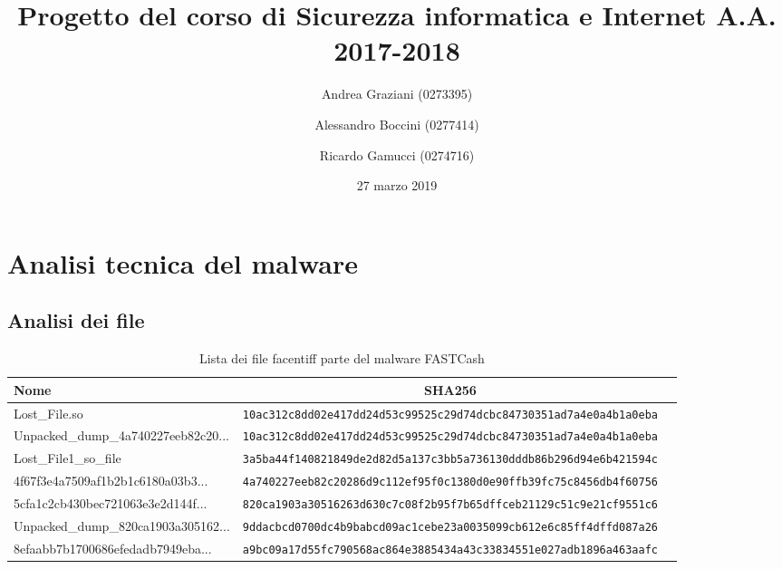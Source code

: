\documentclass[10pt,a4paper, titlepage]{report}
\title{Progetto del corso di Sicurezza informatica e Internet A.A. 2017-2018}
\author[1]{Andrea Graziani (0273395)}
\author[1]{Alessandro Boccini (0277414)}
\author[1]{Ricardo Gamucci (0274716)}
\affil[1]{Università degli Studi di Roma Tor Vergata}
\date{27 marzo 2019}
\begin{document}
\maketitle
\tableofcontents
\newpage

\chapter{Analisi tecnica del malware}

\section{Analisi dei file}

\begin{table}[h!]
  \begin{center}
    \caption{Lista dei file facentiff parte del malware FASTCash}
    \centering
    \label{tab:FilesList}
    
    \begin{adjustbox}{width=1.5\textwidth,center=\textwidth}
 
    \begin{tabular}{l|c|r}
      \toprule
      \textbf{Nome} & \textbf{SHA256} \\
      \midrule
      
      Lost\_File.so & \texttt{10ac312c8dd02e417dd24d53c99525c29d74dcbc84730351ad7a4e0a4b1a0eba} \\
      
      Unpacked\_dump\_4a740227eeb82c20... & \texttt{10ac312c8dd02e417dd24d53c99525c29d74dcbc84730351ad7a4e0a4b1a0eba} \\
  
  Lost\_File1\_so\_file & \texttt{3a5ba44f140821849de2d82d5a137c3bb5a736130dddb86b296d94e6b421594c} \\
    
      4f67f3e4a7509af1b2b1c6180a03b3... & \texttt{4a740227eeb82c20286d9c112ef95f0c1380d0e90ffb39fc75c8456db4f60756} \\ 
      
      5cfa1c2cb430bec721063e3e2d144f... & \texttt{820ca1903a30516263d630c7c08f2b95f7b65dffceb21129c51c9e21cf9551c6} \\
      
      Unpacked\_dump\_820ca1903a305162... & \texttt{9ddacbcd0700dc4b9babcd09ac1cebe23a0035099cb612e6c85ff4dffd087a26} \\
      
      8efaabb7b1700686efedadb7949eba... & \texttt{a9bc09a17d55fc790568ac864e3885434a43c33834551e027adb1896a463aafc} \\
      

\end{tabular}
\end{adjustbox}
\end{center}
\end{table}
\end{document}
